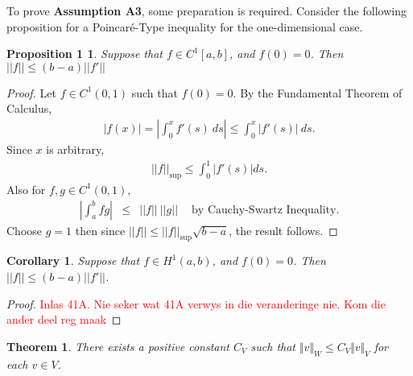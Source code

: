 \documentclass[../../main.tex]{subfiles}
\begin{document}
To prove \textbf{Assumption A3}, some preparation is required. Consider the following proposition for a Poincar\'e-Type inequality for the one-dimensional case.
\newtheorem*{Poincare}{Proposition 1}
\begin{Poincare}
	Suppose that $f \in C^1[a,b]$, and $f(0) = 0$. Then $||f|| \leq (b-a)||f'||$
\end{Poincare}
\begin{proof}
	Let $f \in C^1(0,1)$ such that $f(0) = 0$. By the Fundamental Theorem of Calculus,
	\begin{eqnarray*}
		|f(x)| = \left|\int_0^x f'(s) \ ds\right| \leq \int_0^x |f'(s)| \ ds.
	\end{eqnarray*}
	Since $x$ is arbitrary,
	\begin{eqnarray*}
		||f||_{\sup} \leq \int_0^1 |f'(s)| ds.
	\end{eqnarray*}
	Also for $f,g \in C^1(0,1)$,
	\begin{eqnarray}
		\left| \int_a^b fg \right| & \leq & ||f||\ ||g|| \ \ \ \ \textrm{ by Cauchy-Swartz Inequality.} \label{CSI}
	\end{eqnarray}
	Choose $g = 1$ then since $||f|| \leq ||f||_{\sup} \sqrt{b-a}$, the result follows.
\end{proof}

\newtheorem*{Poincare_2}{Corollary}
\begin{Poincare_2}
	Suppose that $f \in H^1(a,b)$, and $f(0) = 0$. Then $||f|| \leq (b-a)||f'||$.
\end{Poincare_2}
\begin{proof}
	\textcolor{red}{Inlas 41A. Nie seker wat 41A verwys in die veranderinge nie. Kom die ander deel reg maak}
\end{proof}

\newtheorem{Theorem_1}{Theorem}
\begin{Theorem_1}
There exists a positive constant $C_{V}$ such that $\Vert v\Vert_{W} \leq C_{V}\Vert v\Vert_{V}$ for each $v \in V$.
\end{Theorem_1}
\end{document}
